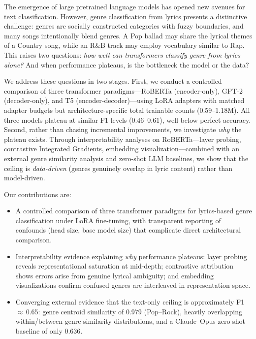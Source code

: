 \documentclass[11pt,a4paper]{article}
\begin{document}
The emergence of large pretrained language models has opened new avenues
for text classification.
However, genre classification from lyrics presents a distinctive
challenge: genres are socially constructed categories with fuzzy
boundaries, and many songs intentionally blend genres.
A Pop ballad may share the lyrical themes of a Country song, while an
R\&B track may employ vocabulary similar to Rap.
This raises two questions: \emph{how well can transformers classify genre
from lyrics alone?} And when performance plateaus, is the bottleneck
the model or the data?

We address these questions in two stages.
First, we conduct a controlled comparison of three transformer
paradigms---RoBERTa (encoder-only), GPT-2 (decoder-only), and T5
(encoder-decoder)---using LoRA adapters \citep{hu2022lora} with matched
adapter budgets but architecture-specific total trainable counts
(0.59--1.18M).
All three models plateau at similar F1 levels (0.46--0.61), well below
perfect accuracy.
Second, rather than chasing incremental improvements, we investigate
\emph{why} the plateau exists.
Through interpretability analyses on RoBERTa---layer probing,
contrastive Integrated Gradients, embedding visualization---combined
with an external genre similarity analysis and zero-shot LLM baselines,
we show that the ceiling is \emph{data-driven} (genres genuinely
overlap in lyric content) rather than model-driven.

Our contributions are:
\begin{itemize}[leftmargin=*,itemsep=2pt]
\item A controlled comparison of three transformer paradigms for
  lyrics-based genre classification under LoRA fine-tuning, with
  transparent reporting of confounds (head size, base model size) that
  complicate direct architectural comparison.
\item Interpretability evidence explaining \emph{why} performance
  plateaus: layer probing reveals representational saturation at
  mid-depth; contrastive attribution shows errors arise from genuine
  lyrical ambiguity; and embedding visualizations confirm confused
  genres are interleaved in representation space.
\item Converging external evidence that the text-only ceiling is
  approximately F1\,$\approx$\,0.65: genre centroid similarity of
  0.979 (Pop--Rock), heavily overlapping within/between-genre
  similarity distributions, and a Claude~Opus zero-shot baseline of
  only 0.636.
\end{itemize}
\end{document}
